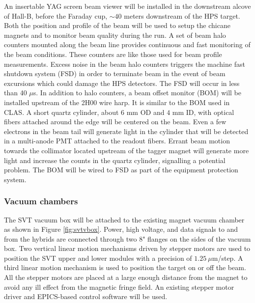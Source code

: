 An insertable YAG screen beam viewer will be installed in the downstream alcove of Hall-B, before the Faraday cup, $\sim 40$ meters downstream 
of the HPS target. Both the position and profile of the beam will be used to setup the chicane magnets and to monitor beam quality during the run. 
A set of beam halo counters mounted along the beam line provides continuous and fast monitoring of the beam conditions. These counters are 
like those used for beam profile measurements. Excess noise in the beam halo counters triggers the machine fast
shutdown system (FSD) in order to terminate beam in the event of beam excursions which could damage the HPS detectors. The FSD will occur 
in less than 40 $\mu$s. In addition to halo counters, a beam offset monitor (BOM) will be installed upstream of the 2H00 wire harp. It is 
similar to the BOM used in CLAS. A short quartz cylinder, about $6$ mm OD and $4$ mm ID, with optical fibers attached around the edge will be centered 
on the beam. Even a few electrons in the beam tail will generate light in the cylinder that will be detected in a multi-anode PMT attached to 
the readout fibers. Errant beam motion towards the collimator located upstream of the tagger magnet will generate more light and increase the counts 
in the quartz cylinder, signalling a potential problem. The BOM will be wired to FSD as part of the equipment protection system. 
 
\subsubsection{Vacuum chambers} 
\label{vacchamb}
 
The SVT vacuum box will be attached to the existing magnet vacuum chamber as shown in Figure \ref{fig:svtvbox}. Power, high voltage, and data 
signals to and from the hybrids are connected through two $8$" flanges on the sides of the vacuum box. Two vertical linear motion mechanisms 
driven by stepper motors 
are used to position the SVT upper and lower modules with a precision of $1.25 ~\mu$m/step. A third linear motion mechanism is used to position 
the target on or off the beam. All the stepper motors are placed at a large enough distance from the magnet to avoid any ill effect from the 
magnetic fringe field.
An existing stepper motor driver and  EPICS-based control software will be used.   
 
